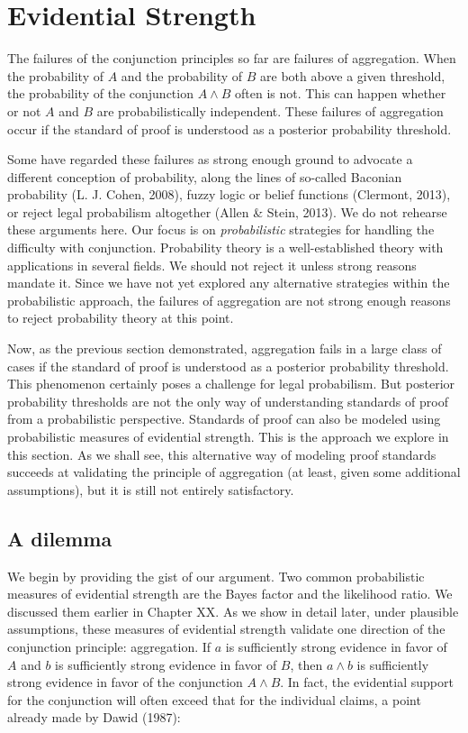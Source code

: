 \documentclass[
  10pt,
  dvipsnames,enabledeprecatedfontcommands]{scrartcl}
\begin{document}
\hypertarget{evidential-strength}{%
\section{Evidential Strength}\label{evidential-strength}}

The failures of the conjunction principles so far are failures of
aggregation. When the probability of \(A\) and the probability of \(B\)
are both above a given threshold, the probability of the conjunction
\(A\wedge B\) often is not. This can happen whether or not \(A\) and
\(B\) are probabilistically independent. These failures of aggregation
occur if the standard of proof is understood as a posterior probability
threshold.

Some have regarded these failures as strong enough ground to advocate a
different conception of probability, along the lines of so-called
Baconian probability (L. J. Cohen, 2008), fuzzy logic or belief
functions (Clermont, 2013), or reject legal probabilism altogether
(Allen \& Stein, 2013). We do not rehearse these arguments here. Our
focus is on \textit{probabilistic} strategies for handling the
difficulty with conjunction. Probability theory is a well-established
theory with applications in several fields. We should not reject it
unless strong reasons mandate it. Since we have not yet explored any
alternative strategies within the probabilistic approach, the failures
of aggregation are not strong enough reasons to reject probability
theory at this point.

Now, as the previous section demonstrated, aggregation fails in a large
class of cases if the standard of proof is understood as a posterior
probability threshold. This phenomenon certainly poses a challenge for
legal probabilism. But posterior probability thresholds are not the only
way of understanding standards of proof from a probabilistic
perspective. Standards of proof can also be modeled using probabilistic
measures of evidential strength. This is the approach we explore in this
section. As we shall see, this alternative way of modeling proof
standards succeeds at validating the principle of aggregation (at least,
given some additional assumptions), but it is still not entirely
satisfactory.

\hypertarget{a-dilemma}{%
\subsection{A dilemma}\label{a-dilemma}}

We begin by providing the gist of our argument. Two common probabilistic
measures of evidential strength are the Bayes factor and the likelihood
ratio. We discussed them earlier in Chapter XX.
 As we show in detail later, under
plausible assumptions, these measures of evidential strength validate
one direction of the conjunction principle: aggregation. If \(a\) is
sufficiently strong evidence in favor of \(A\) and \(b\) is sufficiently
strong evidence in favor of \(B\), then \(a\wedge b\) is sufficiently
strong evidence in favor of the conjunction \(A \wedge B\). In fact, the
evidential support for the conjunction will often exceed that for the
individual claims, a point already made by Dawid (1987):
\end{document}
